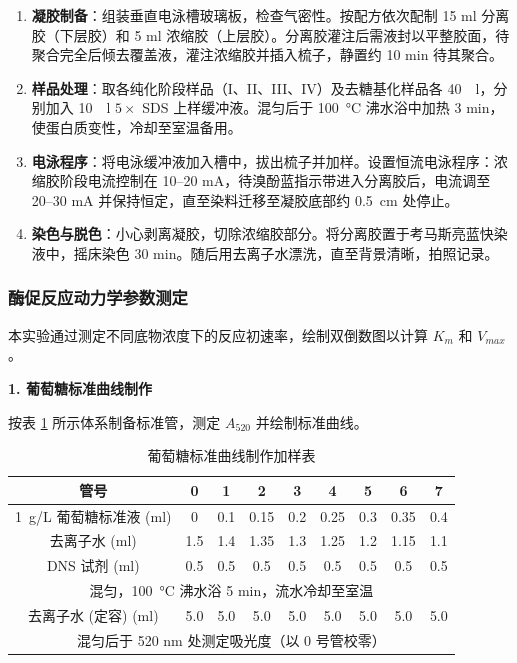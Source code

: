 \documentclass[10.5pt, a4paper]{ctexart}
\begin{document}
\begin{enumerate}
    \item \textbf{凝胶制备}：组装垂直电泳槽玻璃板，检查气密性。按配方依次配制 15 ml 分离胶（下层胶）和 5 ml 浓缩胶（上层胶）。分离胶灌注后需液封以平整胶面，待聚合完全后倾去覆盖液，灌注浓缩胶并插入梳子，静置约 10 min 待其聚合。
    \item \textbf{样品处理}：取各纯化阶段样品（I、II、III、IV）及去糖基化样品各 \SI{40}{\mu l}，分别加入 \SI{10}{\mu l} $5\times$ SDS 上样缓冲液。混匀后于 \SI{100}{\celsius} 沸水浴中加热 3 min，使蛋白质变性，冷却至室温备用。
    \item \textbf{电泳程序}：将电泳缓冲液加入槽中，拔出梳子并加样。设置恒流电泳程序：浓缩胶阶段电流控制在 10--20 mA，待溴酚蓝指示带进入分离胶后，电流调至 20--30 mA 并保持恒定，直至染料迁移至凝胶底部约 \SI{0.5}{cm} 处停止。
    \item \textbf{染色与脱色}：小心剥离凝胶，切除浓缩胶部分。将分离胶置于考马斯亮蓝快染液中，摇床染色 30 min。随后用去离子水漂洗，直至背景清晰，拍照记录。
\end{enumerate}

\subsubsection{酶促反应动力学参数测定}

本实验通过测定不同底物浓度下的反应初速率，绘制双倒数图以计算 $K_m$ 和 $V_{max}$。

\textbf{1. 葡萄糖标准曲线制作}

按表 \ref{tab:std_curve_kinetics} 所示体系制备标准管，测定 $A_{520}$ 并绘制标准曲线。

\begin{table}[H]
    \centering
    \caption{葡萄糖标准曲线制作加样表}
    \label{tab:std_curve_kinetics}
    \begin{tabular}{ccccccccc}
        \toprule
        \textbf{管号} & \textbf{0} & \textbf{1} & \textbf{2} & \textbf{3} & \textbf{4} & \textbf{5} & \textbf{6} & \textbf{7} \\
        \midrule
        \SI{1}{g/L} 葡萄糖标准液 (ml) & 0 & 0.1 & 0.15 & 0.2 & 0.25 & 0.3 & 0.35 & 0.4 \\
        去离子水 (ml) & 1.5 & 1.4 & 1.35 & 1.3 & 1.25 & 1.2 & 1.15 & 1.1 \\
        DNS 试剂 (ml) & 0.5 & 0.5 & 0.5 & 0.5 & 0.5 & 0.5 & 0.5 & 0.5 \\
        \midrule
        \multicolumn{9}{c}{混匀，\SI{100}{\celsius} 沸水浴 5 min，流水冷却至室温} \\
        \midrule
        去离子水 (定容) (ml) & 5.0 & 5.0 & 5.0 & 5.0 & 5.0 & 5.0 & 5.0 & 5.0 \\
        \midrule
        \multicolumn{9}{c}{混匀后于 520 nm 处测定吸光度（以 0 号管校零）} \\
        \bottomrule
    \end{tabular}
\end{table}
\end{document}
